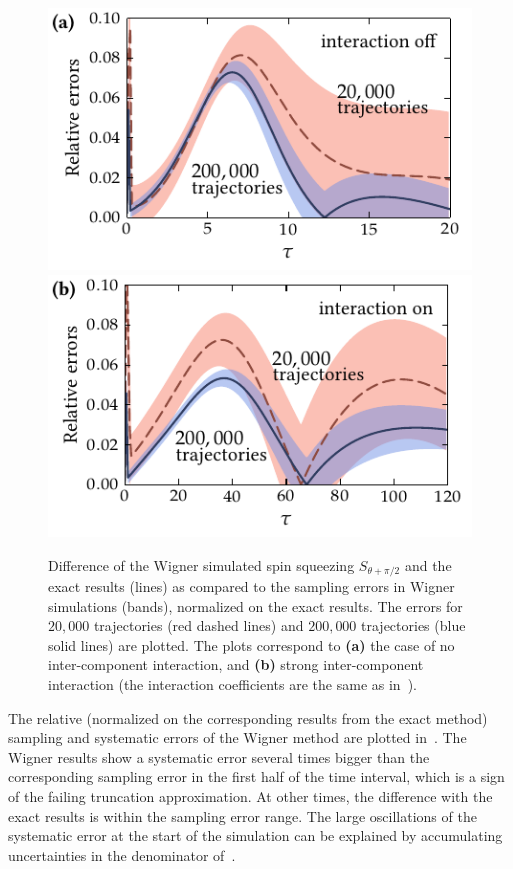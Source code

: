 \begin{figure}
    \centerline{%
    \includegraphics{figures_generated/exact/squeezing_nocc_err.pdf}%
    \includegraphics{figures_generated/exact/squeezing_cc_err.pdf}}

    \caption[Sampling and systematic errors in Wigner simulated spin squeezing]{
    Difference of the Wigner simulated spin squeezing $S_{\theta+\pi/2}$ and the exact results (lines) as compared to the sampling errors in Wigner simulations (bands), normalized on the exact results.
    The errors for $20,000$ trajectories (red dashed lines) and $200,000$ trajectories (blue solid lines) are plotted.
    The plots correspond to \textbf{(a)} the case of no inter-component interaction, and \textbf{(b)} strong inter-component interaction (the interaction coefficients are the same as in~).}%

    \label{fig:exact:squeezing-error-comparison}
\end{figure}

The relative (normalized on the corresponding results from the exact method) sampling and systematic errors of the Wigner method are plotted in~.
The Wigner results show a systematic error several times bigger than the corresponding sampling error in the first half of the time interval, which is a sign of the failing truncation approximation.
At other times, the difference with the exact results is within the sampling error range.
The large oscillations of the systematic error at the start of the simulation can be explained by accumulating uncertainties in the denominator of~.


